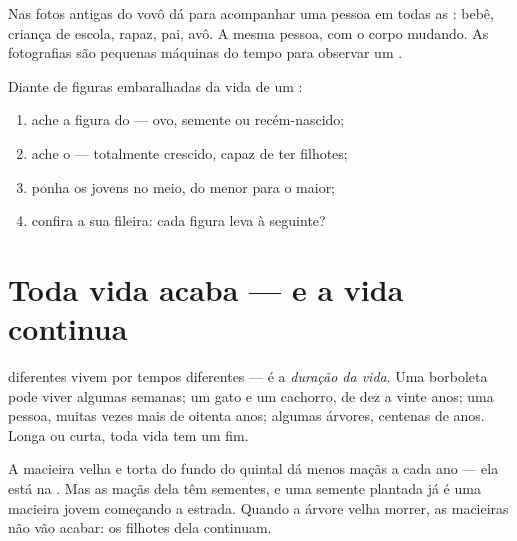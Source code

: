 \begin{example}\label{ex:g2:born-grow-die:photo}
Nas fotos antigas do vovô dá para acompanhar uma pessoa em todas as
: bebê, criança de escola, rapaz, pai, avô. A mesma pessoa,
com o corpo mudando. As fotografias são pequenas máquinas do tempo
para observar um .
\end{example}

\begin{method}\label{met:g2:born-grow-die:order}
Diante de figuras embaralhadas da vida de um :
\begin{enumerate}
  \item ache a figura do  --- ovo, semente ou recém-nascido;
  \item ache o  --- totalmente crescido, capaz de ter filhotes;
  \item ponha os jovens no meio, do menor para o maior;
  \item confira a sua fileira: cada figura leva à seguinte?
\end{enumerate}
\end{method}

\section{Toda vida acaba --- e a vida continua}

\begin{proposition}\label{prop:g2:born-grow-die:lifespan}
 diferentes vivem por tempos diferentes --- é a
\emph{duração da vida}. Uma borboleta pode
viver algumas semanas; um gato e um cachorro, de dez a vinte anos;
uma pessoa, muitas vezes mais de oitenta anos; algumas árvores,
centenas de anos. Longa ou curta, toda vida tem um fim.
\end{proposition}
\admitted

\begin{example}\label{ex:g2:born-grow-die:oldtree}
A macieira velha e torta do fundo do quintal dá menos maçãs a cada
ano --- ela está na . Mas as maçãs dela têm sementes, e uma
semente plantada já é uma macieira jovem começando a estrada. Quando
a árvore velha morrer, as macieiras não vão acabar: os filhotes dela
continuam.
\end{example}

